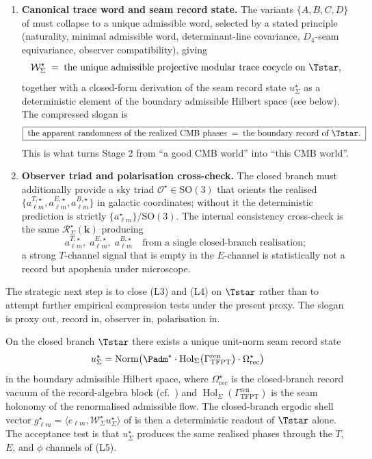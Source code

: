 \begin{remark}
\begin{enumerate}[label=(L\arabic*),leftmargin=2.4em,topsep=3pt,itemsep=2pt]
\item \textbf{Canonical trace word and seam record state.} The variants $\{A,B,C,D\}$ of
 must collapse to a unique admissible word, selected by a stated
principle (naturality, minimal admissible word, determinant-line covariance,
$D_4$-seam equivariance, observer compatibility), giving
\[
\mathcal W_\Sigma^\star\;=\;\text{the unique admissible projective modular trace cocycle on }\Tstar,
\]
together with a closed-form derivation of the seam record state $u_\Sigma^\star$ as a
deterministic element of the boundary admissible Hilbert space (see
 below). The compressed slogan is
\[
\boxed{\;\text{the apparent randomness of the realized CMB phases}\;=\;\text{the boundary record of }\Tstar.\;}
\]
This is what turns Stage 2 from ``a good CMB world'' into ``this CMB world''.

\item \textbf{Observer triad and polarisation cross-check.} The closed branch must additionally
provide a sky triad $\mathcal O^\star\in\mathrm{SO}(3)$ that orients the realised
$\{a_{\ell m}^{T,\star},a_{\ell m}^{E,\star},a_{\ell m}^{B,\star}\}$ in galactic coordinates;
without it the deterministic prediction is strictly $\{a_{\ell m}^\star\}/\mathrm{SO}(3)$. The
internal consistency cross-check is the same $\mathcal R_\Sigma^\star(\mathbf k)$ producing
\[
a_{\ell m}^{T,\star},\;
a_{\ell m}^{E,\star},\;
a_{\ell m}^{B,\star}
\quad\text{from a single closed-branch realisation};
\]
a strong $T$-channel signal that is empty in the $E$-channel is statistically not a record but
apophenia under microscope.
\end{enumerate}
The strategic next step is to close (L3) and (L4) on $\Tstar$ rather than to attempt further
empirical compression tests under the present proxy. The slogan is
\(\text{proxy out, record in, observer in, polarisation in.}\)
\end{remark}

\begin{conjecture}
\label{conj:seam-record-state}
On the closed branch $\Tstar$ there exists a unique unit-norm seam record state
\[
u_\Sigma^\star
=
\operatorname{Norm}\bigl(
\Padm^\star\cdot
\operatorname{Hol}_\Sigma\bigl(\Gamma_{\mathrm{TFPT}}^{\mathrm{ren}}\bigr)\cdot
\Omega_{\mathrm{rec}}^\star
\bigr)
\]
in the boundary admissible Hilbert space, where $\Omega_{\mathrm{rec}}^\star$ is the closed-branch
record vacuum of the record-algebra block (cf.\ ) and
$\operatorname{Hol}_\Sigma(\Gamma_{\mathrm{TFPT}}^{\mathrm{ren}})$ is the seam holonomy of the
renormalised admissible flow. The closed-branch ergodic shell vector
$g_{\ell m}^\star=\langle e_{\ell m},\mathcal W_\Sigma^\star u_\Sigma^\star\rangle$ of
 is then a deterministic readout of $\Tstar$ alone.
The acceptance test is that $u_\Sigma^\star$ produces the same realised phases through the
$T$, $E$, and $\phi$ channels of (L5).
\end{conjecture}

